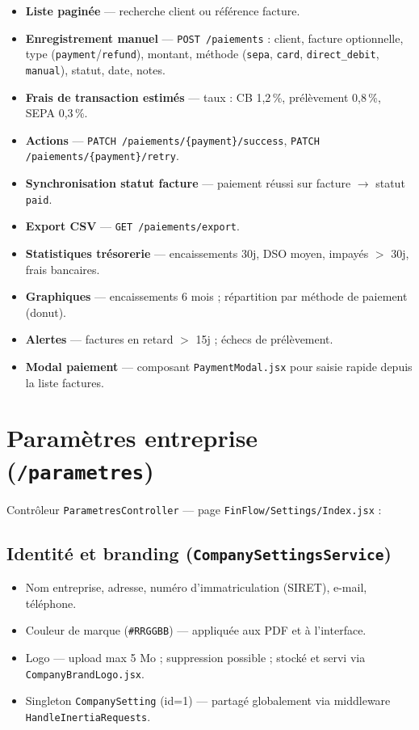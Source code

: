 \documentclass[11pt,a4paper]{report}
\newcommand{\route}[1]{\texttt{\small #1}}
\newcommand{\ctrl}[1]{\texttt{\small #1}}
\newcommand{\svc}[1]{\texttt{\small #1}}
\newcommand{\model}[1]{\texttt{\small #1}}
\newcommand{\feat}[1]{\textbf{#1}}
\begin{document}
\begin{itemize}[leftmargin=*]
    \item \feat{Liste paginée} — recherche client ou référence facture.
    \item \feat{Enregistrement manuel} — \route{POST /paiements} : client, facture optionnelle, type (\texttt{payment}/\texttt{refund}), montant, méthode (\texttt{sepa}, \texttt{card}, \texttt{direct\_debit}, \texttt{manual}), statut, date, notes.
    \item \feat{Frais de transaction estimés} — taux : CB 1{,}2\,\%, prélèvement 0{,}8\,\%, SEPA 0{,}3\,\%.
    \item \feat{Actions} — \route{PATCH /paiements/\{payment\}/success}, \route{PATCH /paiements/\{payment\}/retry}.
    \item \feat{Synchronisation statut facture} — paiement réussi sur facture $\rightarrow$ statut \texttt{paid}.
    \item \feat{Export CSV} — \route{GET /paiements/export}.
    \item \feat{Statistiques trésorerie} — encaissements 30j, DSO moyen, impayés $>$ 30j, frais bancaires.
    \item \feat{Graphiques} — encaissements 6 mois ; répartition par méthode de paiement (donut).
    \item \feat{Alertes} — factures en retard $>$ 15j ; échecs de prélèvement.
    \item \feat{Modal paiement} — composant \texttt{PaymentModal.jsx} pour saisie rapide depuis la liste factures.
\end{itemize}

\section{Paramètres entreprise (\route{/parametres})}

Contrôleur \ctrl{ParametresController} — page \texttt{FinFlow/Settings/Index.jsx} :

\subsection{Identité et branding (\svc{CompanySettingsService})}

\begin{itemize}[leftmargin=*]
    \item Nom entreprise, adresse, numéro d'immatriculation (SIRET), e-mail, téléphone.
    \item Couleur de marque (\texttt{\#RRGGBB}) — appliquée aux PDF et à l'interface.
    \item Logo — upload max 5 Mo ; suppression possible ; stocké et servi via \texttt{CompanyBrandLogo.jsx}.
    \item Singleton \model{CompanySetting} (id=1) — partagé globalement via middleware \texttt{HandleInertiaRequests}.
\end{itemize}
\end{document}
